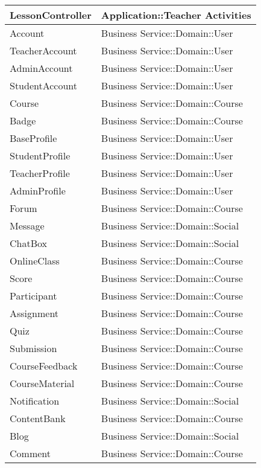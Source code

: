 \documentclass[./../main_file.tex]{subfiles}
\begin{document}
\begin{longtable}{|p{.5\linewidth}|p{.5\linewidth}|}
		LessonController         & Application::Teacher Activities               \\ \hline
		Account                  & Business Service::Domain::User                \\ \hline
		TeacherAccount           & Business Service::Domain::User                \\ \hline
		AdminAccount             & Business Service::Domain::User                \\ \hline
		StudentAccount           & Business Service::Domain::User                \\ \hline
		Course                   & Business Service::Domain::Course              \\ \hline
		Badge                    & Business Service::Domain::Course              \\ \hline
		BaseProfile              & Business Service::Domain::User                \\ \hline
		StudentProfile           & Business Service::Domain::User                \\ \hline
		TeacherProfile           & Business Service::Domain::User                \\ \hline
		AdminProfile             & Business Service::Domain::User                \\ \hline
		Forum                    & Business Service::Domain::Course              \\ \hline
		Message                  & Business Service::Domain::Social              \\ \hline
		ChatBox                  & Business Service::Domain::Social              \\ \hline
		OnlineClass              & Business Service::Domain::Course              \\ \hline
		Score                    & Business Service::Domain::Course              \\ \hline
		Participant              & Business Service::Domain::Course              \\ \hline
		Assignment               & Business Service::Domain::Course              \\ \hline
		Quiz                     & Business Service::Domain::Course              \\ \hline
		Submission               & Business Service::Domain::Course              \\ \hline
		CourseFeedback           & Business Service::Domain::Course              \\ \hline
		CourseMaterial           & Business Service::Domain::Course              \\ \hline
		Notification             & Business Service::Domain::Social              \\ \hline
		ContentBank              & Business Service::Domain::Course              \\ \hline
		Blog                     & Business Service::Domain::Social              \\ \hline
		Comment                  & Business Service::Domain::Course              \\ \hline
	\end{longtable}
\end{document}
